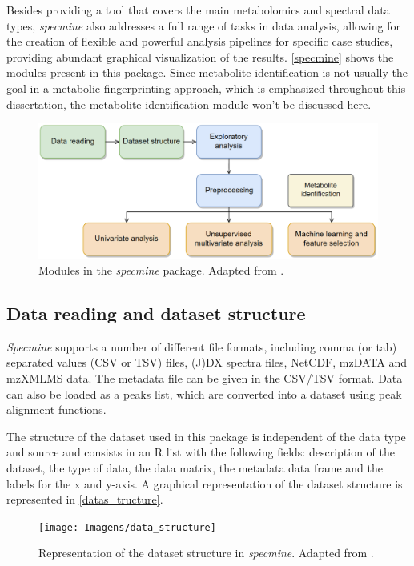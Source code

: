 Besides providing a tool that covers the main metabolomics and spectral data types, \textit{specmine} also addresses a full range of tasks in data analysis, allowing for the creation of flexible and powerful analysis pipelines for specific case studies, providing abundant graphical visualization of the results. \autoref{specmine} shows the modules present in this package. Since metabolite identification is not usually the goal in a metabolic fingerprinting approach, which is emphasized throughout this dissertation, the metabolite identification module won't be discussed here.

\begin{figure}[!htb]
	\centering
	\includegraphics[width=0.85\linewidth]{Imagens/specmine}
	\caption{Modules in the \textit{specmine} package. Adapted from \cite{costa2016r}.}
	\label{specmine}
\end{figure}

\subsection{Data reading and dataset structure}

\textit{Specmine} supports a number of different file formats, including comma (or tab) separated values (CSV or TSV) files, (J)DX spectra files, NetCDF, mzDATA and mzXMLMS data. The metadata file can be given in the CSV/TSV format. Data can also be loaded as a peaks list, which are converted into a dataset using peak alignment functions. 

The structure of the dataset used in this package is independent of the data type and source and consists in an R list with the following fields: description of the dataset, the type of data, the data matrix, the metadata data frame and the labels for the x and y-axis. A graphical representation of the dataset structure is represented in \autoref{datas_tructure}.


\begin{figure}[!htb]
	\centering
	\texttt{[image: Imagens/data\_structure]}
	\caption{Representation of the dataset structure in \textit{specmine}. Adapted from \cite{costa2016r}.}
	\label{datas_tructure}
\end{figure}

